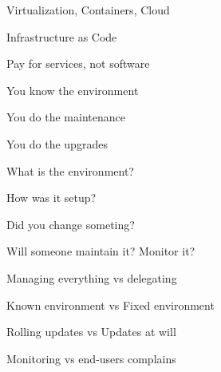 \titleSlide


\inuitsSlide

\begin{iframe}[IT Nowadays (?)]
\item Virtualization, Containers, Cloud
\item Infrastructure as Code
\item Pay for services, not software
\end{iframe}

\begin{iframe}
\item You know the environment
\item You do the maintenance
\item You do the upgrades
\end{iframe}

\begin{iframe}
\item What is the environment?
\item How was it setup?
\item Did you change someting?
\item Will someone maintain it? Monitor it?
\end{iframe}

\begin{iframe}
\item Managing everything vs delegating
\item Known environment vs Fixed environment
\item Rolling updates vs Updates at will
\item Monitoring vs end-users complains
\end{iframe}

